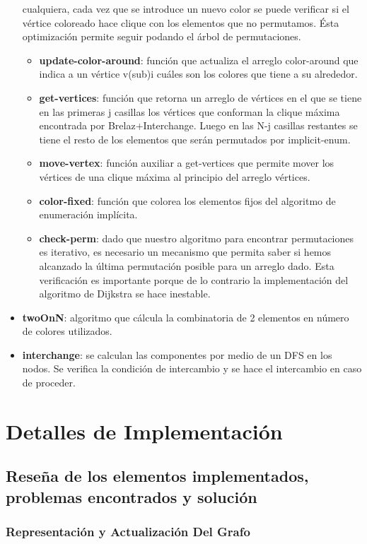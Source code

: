 \documentclass[a4paper,10pt]{article}
\begin{document}
\begin{itemize}
cualquiera, cada vez que se introduce un nuevo color se puede verificar si el vértice coloreado hace clique con los elementos que no permutamos. Ésta optimización permite seguir podando el árbol de permutaciones.
\begin{itemize}
\item \textbf{update-color-around}: función que actualiza el arreglo color-around que indica a un vértice v(sub)i cuáles son 
los colores que tiene a su alrededor.
\item \textbf{get-vertices}: función que retorna un arreglo de vértices en el que se tiene en las primeras j casillas los vértices que conforman la clique máxima encontrada por Brelaz+Interchange. Luego en las N-j casillas restantes se tiene el resto de los elementos que serán permutados por implicit-enum.
\item \textbf{move-vertex}: función auxiliar a get-vertices que permite mover los vértices de una clique máxima al principio del arreglo vértices.
\item \textbf{color-fixed}: función que colorea los elementos fijos del algoritmo de enumeración implícita.
\item \textbf{check-perm}: dado que nuestro algoritmo para encontrar permutaciones es iterativo, es necesario un mecanismo que permita saber si hemos alcanzado la última permutación posible para un arreglo dado. Esta verificación es importante porque de lo contrario la implementación del algoritmo de Dijkstra se hace inestable.
\end{itemize}

\item \textbf{twoOnN}: algoritmo que cálcula la combinatoria de 2 elementos en número de colores utilizados.
\item \textbf{interchange}: se calculan las componentes por medio de un DFS en los nodos. Se verifica la condición de intercambio 
y se hace el intercambio en caso de proceder.
\end{itemize}
\newpage
\section{Detalles de Implementación}

\subsection{Reseña de los elementos implementados, problemas encontrados y solución}

\subsubsection{Representación y Actualización Del Grafo}
\end{document}
